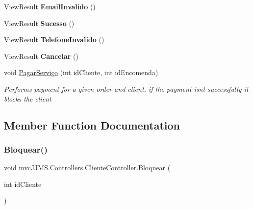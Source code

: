 \begin{DoxyCompactItemize}
View\+Result {\bfseries Email\+Invalido} ()
\item 
\mbox{\label{classmvc_j_j_m_s_1_1_controllers_1_1_cliente_controller_ab65d2ba3cdb037df769d23b70216749d}} 
View\+Result {\bfseries Sucesso} ()
\item 
\mbox{\label{classmvc_j_j_m_s_1_1_controllers_1_1_cliente_controller_a8d1e06b92f61ed481fa342837fcd2e7f}} 
View\+Result {\bfseries Telefone\+Invalido} ()
\item 
\mbox{\label{classmvc_j_j_m_s_1_1_controllers_1_1_cliente_controller_a0043cef3a9faa31c164bfba141b5d22b}} 
View\+Result {\bfseries Cancelar} ()
\item 
void \mbox{\hyperlink{classmvc_j_j_m_s_1_1_controllers_1_1_cliente_controller_ac3bcc6f76f48dfc5553f1686e2f44dd5}{Pagar\+Serviço}} (int id\+Cliente, int id\+Encomenda)
\begin{DoxyCompactList}\small\item\em Performs payment for a given order and client, if the payment isn\textquotesingle{}t successfully it blocks the client \end{DoxyCompactList}\end{DoxyCompactItemize}


\subsection{Member Function Documentation}
\mbox{\label{classmvc_j_j_m_s_1_1_controllers_1_1_cliente_controller_a75678bb2dcb7f48853343d9bf898d64a}} 
\subsubsection{\texorpdfstring{Bloquear()}{Bloquear()}}
{\footnotesize\ttfamily void mvc\+J\+J\+M\+S.\+Controllers.\+Cliente\+Controller.\+Bloquear (\begin{DoxyParamCaption}\item[{int}]{id\+Cliente }\end{DoxyParamCaption})\hspace{0.3cm}{\ttfamily [inline]}}



